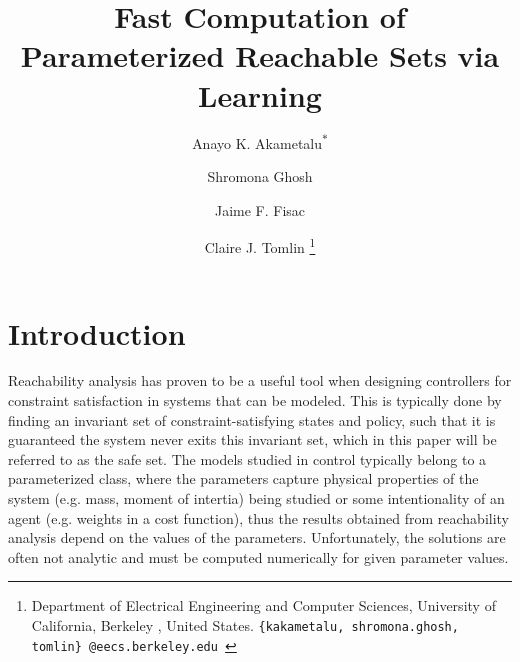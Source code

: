 \documentclass{journal}
\title{\LARGE \bf
Fast Computation of Parameterized Reachable Sets via Learning 
}
\author{
Anayo K. Akametalu\textsuperscript{$*$} \and Shromona Ghosh \and Jaime F. Fisac \and Claire J. Tomlin
\thanks{
 Department of Electrical Engineering and Computer Sciences, 
        University of California, Berkeley , United States.\newline
        {\tt\small \{kakametalu, shromona.ghosh, tomlin\}~@eecs.berkeley.edu }}%
}
\begin{document}
\maketitle
\thispagestyle{empty}
\pagestyle{empty}



\section{Introduction}
Reachability analysis has proven to be a useful tool when designing controllers for constraint satisfaction in systems that can be modeled. This is typically done by finding an invariant set of constraint-satisfying states and policy, such that it is guaranteed the system never exits this invariant set, which in this paper will be referred to as the safe set. The models studied in control typically belong to a parameterized class, where the parameters capture physical properties of the system (e.g. mass, moment of intertia) being studied or some intentionality of an agent (e.g. weights in a cost function), thus the results obtained from reachability analysis depend on the values of the parameters. Unfortunately, the solutions are often not analytic and must be computed numerically for given parameter values.
\end{document}
